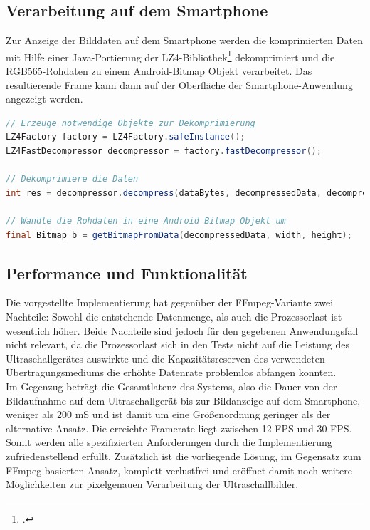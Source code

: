 \subsection{Verarbeitung auf dem Smartphone}
Zur Anzeige der Bilddaten auf dem Smartphone werden die komprimierten Daten mit Hilfe einer Java-Portierung der LZ4-Bibliothek\footcite{JPounzLZ4} dekomprimiert und die RGB565-Rohdaten zu einem Android-Bitmap Objekt verarbeitet. Das resultierende Frame kann dann auf der Oberfläche der Smartphone-Anwendung angezeigt werden.

\begin{lstlisting}[caption=Dekompression der Daten, label=lst:decompression, language=Java]
// Erzeuge notwendige Objekte zur Dekomprimierung
LZ4Factory factory = LZ4Factory.safeInstance();
LZ4FastDecompressor decompressor = factory.fastDecompressor();

// Dekomprimiere die Daten
int res = decompressor.decompress(dataBytes, decompressedData, decompressedData.length);

// Wandle die Rohdaten in eine Android Bitmap Objekt um
final Bitmap b = getBitmapFromData(decompressedData, width, height);
\end{lstlisting}

\subsection{Performance und Funktionalität}
Die vorgestellte Implementierung hat gegenüber der FFmpeg-Variante zwei Nachteile: Sowohl die entstehende Datenmenge, als auch die Prozessorlast ist wesentlich höher. Beide Nachteile sind jedoch für den gegebenen Anwendungsfall nicht relevant, da die Prozessorlast sich in den Tests nicht auf die Leistung des Ultraschallgerätes auswirkte und die Kapazitätsreserven des verwendeten Übertragungsmediums die erhöhte Datenrate problemlos abfangen konnten.\\
Im Gegenzug beträgt die Gesamtlatenz des Systems, also die Dauer von der Bildaufnahme auf dem Ultraschallgerät bis zur Bildanzeige auf dem Smartphone, weniger als 200 mS und ist damit um eine Größenordnung geringer als der alternative Ansatz. Die erreichte Framerate liegt zwischen 12 FPS und 30 FPS. Somit werden alle spezifizierten Anforderungen durch die Implementierung zufriedenstellend erfüllt. Zusätzlich ist die vorliegende Lösung, im Gegensatz zum FFmpeg-basierten Ansatz, komplett verlustfrei und eröffnet damit noch weitere Möglichkeiten zur pixelgenauen Verarbeitung der Ultraschallbilder.

